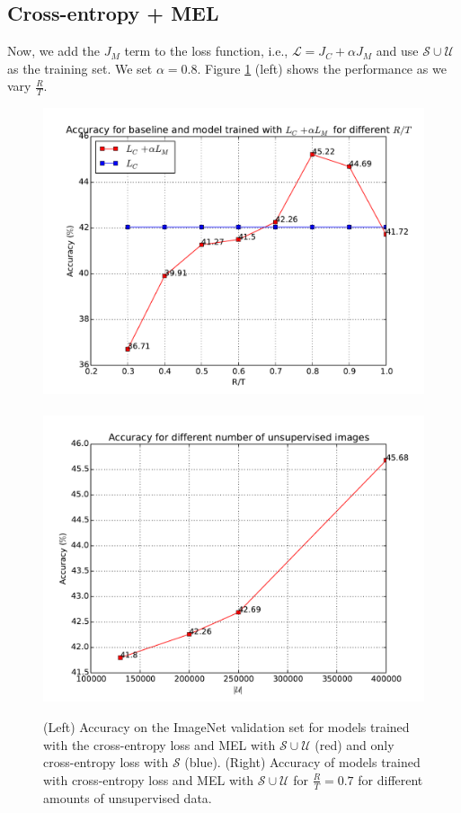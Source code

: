\documentclass[runningheads]{llncs}
\begin{document}
\subsection{Cross-entropy + MEL}
Now, we add the $J_M$ term to the loss function, i.e., $\mathcal{L} = J_C + \alpha
J_M$ and use $\mathcal{S} \cup \mathcal{U}$ as the training set. We set $\alpha = 0.8$. Figure
\ref{fig:acc} (left) shows the performance as we vary $\frac{R}{T}$.

\begin{figure}
	\centering
	{
		\includegraphics[scale=0.35]{accuracies.pdf}
	~
		\includegraphics[scale=0.35]{accuracies_unsup.pdf}
	}
		\caption{(Left) Accuracy on the ImageNet validation set for models trained with the cross-entropy
		loss and MEL with $\mathcal{S}\cup\mathcal{U}$ (red) and only cross-entropy loss with
	$\mathcal{S}$ (blue). (Right) Accuracy of models trained with cross-entropy loss and MEL with
$\mathcal{S}\cup\mathcal{U}$ for $\frac{R}{T} = 0.7$ for different amounts of unsupervised data.}
		\label{fig:acc}
\end{figure}
\end{document}
